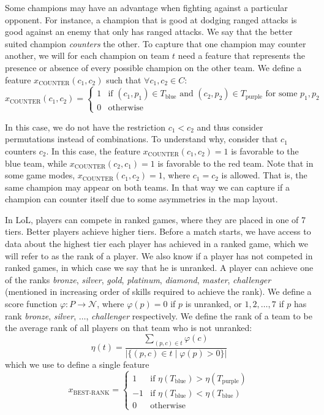 Some champions may have an advantage when fighting against a particular opponent.
For instance, a champion that is good at dodging ranged attacks is good against an enemy that only has ranged attacks.
We say that the better suited champion \emph{counters} the other.
To capture that one champion may counter another, we will for each champion on team $t$ need a feature that represents the presence or absence of every possible champion on the other team.
We define a feature $x_\text{COUNTER}(c_1, c_2)$ such that $\forall c_1, c_2 \in C:$
\[x_\text{COUNTER}(c_1, c_2) = 
\begin{cases} 
1 & \text{if } (c_1, p_1) \in T_\text{blue} \text{ and } (c_2, p_2) \in T_\text{purple} \text{ for some } p_1, p_2 \\ 
0 & \text{otherwise} 
\end{cases}\]

In this case, we do not have the restriction $c_1 < c_2$ and thus consider permutations instead of combinations.
To understand why, consider that $c_1$ counters $c_2$.
In this case, the feature $x_\text{COUNTER}(c_1, c_2) = 1$ is favorable to the blue team, while $x_\text{COUNTER}(c_2, c_1) = 1$ is favorable to the red team.
Note that in some game modes, $x_\text{COUNTER}(c_1, c_2) = 1$, where $c_1 = c_2$ is allowed. That is, the same champion may appear on both teams.
In that way we can capture if a champion can counter itself due to some asymmetries in the map layout.

In LoL, players can compete in ranked games, where they are placed in one of 7 tiers. Better players achieve higher tiers.
Before a match starts, we have access to data about the highest tier each player has achieved in a ranked game, which we will refer to as the rank of a player. We also know if a player has not competed in ranked games, in which case we say that he is unranked.
A player can achieve one of the ranks \textit{bronze}, \textit{silver}, \textit{gold}, \textit{platinum}, \textit{diamond}, \textit{master}, \textit{challenger} (mentioned in increasing order of skills required to achieve the rank).
We define a score function $\varphi : P \rightarrow \mathcal{N}$, where $\varphi(p) = 0$ if $p$ is unranked, or $1, 2, \dots, 7$ if $p$ has rank \textit{bronze}, \textit{silver}, $\dots$, \textit{challenger} respectively.
We define the rank of a team to be the average rank of all players on that team who is not unranked:
\[
\eta(t) = \frac{\sum\limits_{(p, c) \in t} \varphi(c)}{|\{(p, c) \in t \mid \varphi(p) > 0\}|}
\]
which we use to define a single feature
\[
x_\text{BEST-RANK} = 
\begin{cases} 
  1 & \text{if } \eta(T_\text{blue}) > \eta(T_\text{purple})\\
  -1 & \text{if } \eta(T_\text{blue}) < \eta(T_\text{blue})\\
  0 & \text{otherwise} 
\end{cases}
\]

